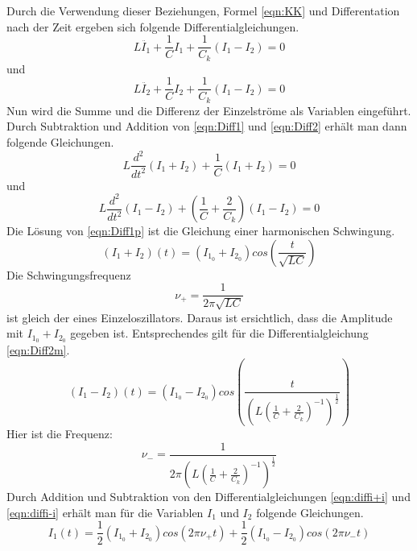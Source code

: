 Durch die Verwendung dieser Beziehungen, Formel \eqref{eqn:KK} und Differentation nach der Zeit ergeben sich folgende Differentialgleichungen.
\begin{equation}
  L\ddot{I_1} + \frac{1}{C}I_1 + \frac{1}{C_k}(I_1 - I_2) = 0
  \label{eqn:Diff1}
\end{equation}
und
\begin{equation}
  L\ddot{I_2} + \frac{1}{C}I_2 + \frac{1}{C_k}(I_1 - I_2) = 0
  \label{eqn:Diff2}
\end{equation}
Nun wird die Summe und die Differenz der Einzelströme als Variablen eingeführt. Durch Subtraktion und Addition von \eqref{eqn:Diff1} und \eqref{eqn:Diff2} erhält man dann folgende Gleichungen.
\begin{equation}
  L \frac{d^2}{dt^2}(I_1 + I_2) + \frac{1}{C} (I_1 + I_2) = 0
  \label{eqn:Diff1p}
\end{equation}
und
\begin{equation}
  L \frac{d^2}{dt^2}(I_1 - I_2) + \left(\frac{1}{C} + \frac{2}{C_k}\right) (I_1 - I_2) = 0
  \label{eqn:Diff2m}
\end{equation}
Die Lösung von \eqref{eqn:Diff1p} ist die Gleichung einer harmonischen Schwingung.
\begin{equation}
  (I_1 + I_2)(t) = (I_{1_{0}} + I_{2_{0}}) cos \left(\frac{t}{\sqrt{LC}}\right)
  \label{eqn:diffi+i}
\end{equation}
Die Schwingungsfrequenz
\begin{equation}
  \nu_+ = \frac{1}{2\pi\sqrt{LC}}
  \label{eqn:nu+}
\end{equation}
ist gleich der eines Einzeloszillators. Daraus ist ersichtlich, dass die Amplitude mit $ I_{1_{0}} + I_{2_{0}} $ gegeben ist. Entsprechendes gilt für die
Differentialgleichung \eqref{eqn:Diff2m}.
\begin{equation}
  (I_1 - I_2)(t) = (I_{1_{0}} - I_{2_{0}}) cos \left(\frac{t}{\left(L\left(\frac{1}{C} + \frac{2}{C_k}\right)^{-1}\right)^{\frac{1}{2}}}\right)
  \label{eqn:diffi-i}
\end{equation}
Hier ist die Frequenz:
\begin{equation}
  \nu_- = \frac{1}{2\pi \left(L\left(\frac{1}{C} + \frac{2}{C_k}\right)^{-1}\right)^{\frac{1}{2}}}
\label{eqn:nu-}
\end{equation}
Durch Addition und Subtraktion von den Differentialgleichungen \eqref{eqn:diffi+i} und \eqref{eqn:diffi-i} erhält man für die Variablen $I_1$ und $I_2$ folgende Gleichungen.
\begin{equation}
  I_1 (t) = \frac{1}{2}(I_{1_{0}} + I_{2_{0}}) cos(2 \pi \nu_+ t) + \frac{1}{2}(I_{1_{0}} - I_{2_{0}})cos(2 \pi \nu_- t)
  \label{eqn:diffi1t}
\end{equation}
